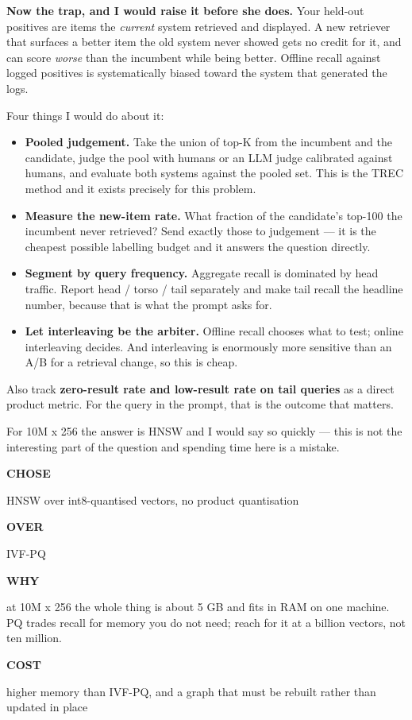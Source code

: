 \documentclass[10pt,twoside]{book}
\newcommand{\csection}[1]{\par\vspace{13pt}\noindent{\sffamily\large\bfseries\color{ink}\raggedright #1\par}\vspace{4pt}}
\newenvironment{decide}[1]{%
  \par\smallskip\noindent
  \begin{tcolorbox}[colback=white,colframe=accent,boxrule=1pt,arc=3pt,
    left=8pt,right=8pt,top=6pt,bottom=5pt,
    title={\sffamily\bfseries\small #1},coltitle=white,colbacktitle=accent,
    fonttitle=\sffamily]%
  \small%
}{\end{tcolorbox}\par\smallskip}
\newcommand{\drow}[2]{%
  \par\noindent
  \begin{minipage}[t]{58pt}\raggedright\strut
    {\sffamily\bfseries\scriptsize\color{accent}#1}\end{minipage}%
  \hspace{6pt}%
  \begin{minipage}[t]{\dimexpr\linewidth-64pt\relax}\strut #2\end{minipage}%
  \par\vspace{3.5pt}}
\begin{document}
\textbf{Now the trap, and I would raise it before she does.} Your held-out positives are items the \textit{current} system retrieved and displayed. A new retriever that surfaces a better item the old system never showed gets no credit for it, and can score \textit{worse} than the incumbent while being better. Offline recall against logged positives is systematically biased toward the system that generated the logs.\par
Four things I would do about it:\par
\begin{itemize}
\item \textbf{Pooled judgement.} Take the union of top-K from the incumbent and the candidate, judge the pool with humans or an LLM judge calibrated against humans, and evaluate both systems against the pooled set. This is the TREC method and it exists precisely for this problem.
\item \textbf{Measure the new-item rate.} What fraction of the candidate's top-100 the incumbent never retrieved? Send exactly those to judgement --- it is the cheapest possible labelling budget and it answers the question directly.
\item \textbf{Segment by query frequency.} Aggregate recall is dominated by head traffic. Report head / torso / tail separately and make tail recall the headline number, because that is what the prompt asks for.
\item \textbf{Let interleaving be the arbiter.} Offline recall chooses what to test; online interleaving decides. And interleaving is enormously more sensitive than an A/B for a retrieval change, so this is cheap.
\end{itemize}
Also track \textbf{zero-result rate and low-result rate on tail queries} as a direct product metric. For the query in the prompt, that is the outcome that matters.\par
\csection{The ANN index}
For 10M x 256 the answer is HNSW and I would say so quickly --- this is not the interesting part of the question and spending time here is a mistake.\par
\begin{decide}{Which ANN index?}
\drow{CHOSE}{HNSW over int8-quantised vectors, no product quantisation}
\drow{OVER}{IVF-PQ}
\drow{WHY}{at 10M x 256 the whole thing is about 5 GB and fits in RAM on one machine. PQ trades recall for memory you do not need; reach for it at a billion vectors, not ten million.}
\drow{COST}{higher memory than IVF-PQ, and a graph that must be rebuilt rather than updated in place}
\end{decide}
\end{document}
